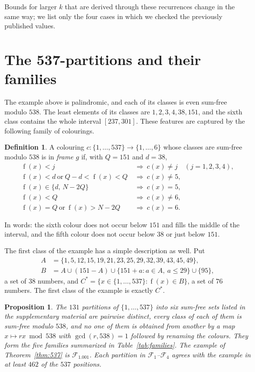 \documentclass[11pt,a4paper]{article}
\newtheorem{proposition}[theorem]{Proposition}
\theoremstyle{definition}
\newtheorem{definition}[theorem]{Definition}
\newcommand{\fold}{\operatorname{f}}
\begin{document}
Bounds for larger $k$ that are derived through these recurrences change in the same
way; we list only the four cases in which we checked the previously published
values.

\section{The 537-partitions and their families}\label{sec:families}
The example above is palindromic, and each of its classes is even sum-free modulo
$538$. The least elements of its classes are $1,2,3,4,38,151$, and the sixth class
contains the whole interval $[237,301]$. These features are captured by the
following family of colourings.

\begin{definition}\label{def:frameg}
A colouring $c\colon\{1,\dots,537\}\to\{1,\dots,6\}$ whose classes are sum-free
modulo $538$ is in \emph{frame $g$} if, with $Q=151$ and $d=38$,
\begin{align*}
 \fold(x)<j &\ \Rightarrow\ c(x)\neq j \quad (j=1,2,3,4),\\
 \fold(x)<d \ \text{or}\ Q-d<\fold(x)<Q &\ \Rightarrow\ c(x)\neq 5,\\
 \fold(x)\in\{d,\,N-2Q\} &\ \Rightarrow\ c(x)=5,\\
 \fold(x)<Q &\ \Rightarrow\ c(x)\neq 6,\\
 \fold(x)=Q \ \text{or}\ \fold(x)>N-2Q &\ \Rightarrow\ c(x)=6.
\end{align*}
\end{definition}

In words: the sixth colour does not occur below $151$ and fills the middle of the
interval, and the fifth colour does not occur below $38$ or just below $151$.

The first class of the example has a simple description as well. Put
\begin{align*}
A&=\{1,5,12,15,19,21,23,25,29,32,39,43,45,49\},\\
B&=A\cup(151-A)\cup\{151+a: a\in A,\ a\le 29\}\cup\{95\},
\end{align*}
a set of $38$ numbers, and $C^*=\{x\in\{1,\dots,537\}:\fold(x)\in B\}$, a set of $76$
numbers. The first class of the example is exactly $C^*$.

\begin{proposition}\label{prop:families}
The $131$ partitions of $\{1,\dots,537\}$ into six sum-free sets listed in
the supplementary material are pairwise distinct, every class of each of them is
sum-free modulo $538$, and no one of them is obtained from another by a map
$x\mapsto rx \bmod 538$ with $\gcd(r,538)=1$ followed by renaming the colours.
They form the five families summarized in Table~\ref{tab:families}.
The example of Theorem~\ref{thm:537} is $\mathcal F_1.001$.
Each partition in $\mathcal F_1$--$\mathcal F_4$ agrees with the example in at least
$462$ of the $537$ positions.
\end{proposition}
\end{document}

